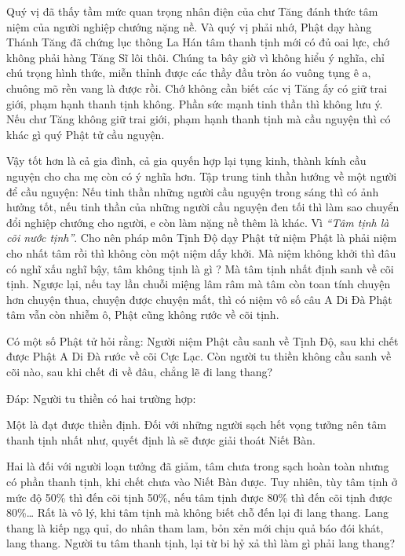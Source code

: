 \documentclass[
  12pt,
  oneside]{book}
\begin{document}
Quý vị đã thấy tầm mức quan trọng nhân điện của chư Tăng đánh thức tâm niệm của người nghiệp chướng nặng nề. Và quý vị phải nhớ, Phật dạy hàng Thánh Tăng đã chứng lục thông La Hán tâm thanh tịnh mới có đủ oai lực, chớ không phải hàng Tăng Sĩ lôi thôi. Chúng ta bây giờ vì không hiểu ý nghĩa, chỉ chú trọng hình thức, miễn thỉnh được các thầy đầu tròn áo vuông tụng ê a, chuông mõ rền vang là được rồi. Chớ không cần biết các vị Tăng ấy có giữ trai giới, phạm hạnh thanh tịnh không. Phần sức mạnh tinh thần thì không lưu ý. Nếu chư Tăng không giữ trai giới, phạm hạnh thanh tịnh mà cầu nguyện thì có khác gì quý Phật tử cầu nguyện.

Vậy tốt hơn là cả gia đình, cả gia quyến hợp lại tụng kinh, thành kính cầu nguyện cho cha mẹ còn có ý nghĩa hơn. Tập trung tinh thần hướng về một người để cầu nguyện: Nếu tinh thần những người cầu nguyện trong sáng thì có ảnh hưởng tốt, nếu tinh thần của những người cầu nguyện đen tối thì làm sao chuyển đổi nghiệp chướng cho người, e còn làm nặng nề thêm là khác. Vì \emph{``Tâm tịnh là cõi nước tịnh''}. Cho nên pháp môn Tịnh Độ dạy Phật tử niệm Phật là phải niệm cho nhất tâm rồi thì không còn một niệm dấy khởi. Mà niệm không khởi thì đâu có nghĩ xấu nghĩ bậy, tâm không tịnh là gì ? Mà tâm tịnh nhất định sanh về cõi tịnh. Ngược lại, nếu tay lần chuỗi miệng lâm râm mà tâm còn toan tính chuyện hơn chuyện thua, chuyện được chuyện mất, thì có niệm vô số câu A Di Đà Phật tâm vẫn còn nhiễm ô, Phật cũng không rước về cõi tịnh.

Có một số Phật tử hỏi rằng: Người niệm Phật cầu sanh về Tịnh Độ, sau khi chết được Phật A Di Đà rước về cõi Cực Lạc. Còn người tu thiền không cầu sanh về cõi nào, sau khi chết đi về đâu, chẳng lẽ đi lang thang?

Đáp: Người tu thiền có hai trường hợp:

Một là đạt được thiền định. Đối với những người sạch hết vọng tưởng nên tâm thanh tịnh nhất như, quyết định là sẽ được giải thoát Niết Bàn.

Hai là đối với người loạn tưởng đã giảm, tâm chưa trong sạch hoàn toàn nhưng có phần thanh tịnh, khi chết chưa vào Niết Bàn được. Tuy nhiên, tùy tâm tịnh ở mức độ 50\% thì đến cõi tịnh 50\%, nếu tâm tịnh được 80\% thì đến cõi tịnh được 80\%\ldots{} Rất là vô lý, khi tâm tịnh mà không biết chỗ đến lại đi lang thang. Lang thang là kiếp ngạ quỉ, do nhân tham lam, bỏn xẻn mới chịu quả báo đói khát, lang thang. Người tu tâm thanh tịnh, lại từ bi hỷ xả thì làm gì phải lang thang?
\end{document}

